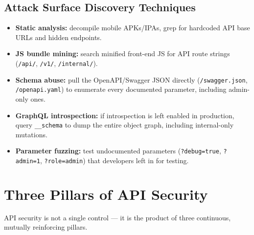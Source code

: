 \documentclass[11pt]{article}
\begin{document}
\subsection{Attack Surface Discovery Techniques}
\begin{itemize}
  \item \textbf{Static analysis:} decompile mobile APKs/IPAs, grep for hardcoded API base URLs and hidden endpoints.
  \item \textbf{JS bundle mining:} search minified front-end JS for API route strings (\texttt{/api/}, \texttt{/v1/}, \texttt{/internal/}).
  \item \textbf{Schema abuse:} pull the OpenAPI/Swagger JSON directly (\texttt{/swagger.json}, \texttt{/openapi.yaml}) to enumerate every documented parameter, including admin-only ones.
  \item \textbf{GraphQL introspection:} if introspection is left enabled in production, query \texttt{\_\_schema} to dump the entire object graph, including internal-only mutations.
  \item \textbf{Parameter fuzzing:} test undocumented parameters (\texttt{?debug=true}, \texttt{?admin=1}, \texttt{?role=admin}) that developers left in for testing.
\end{itemize}

\newpage
\section{Three Pillars of API Security}

\begin{center}
\end{center}
\vspace{4pt}

API security is not a single control --- it is the product of three continuous, mutually reinforcing pillars.
\end{document}
